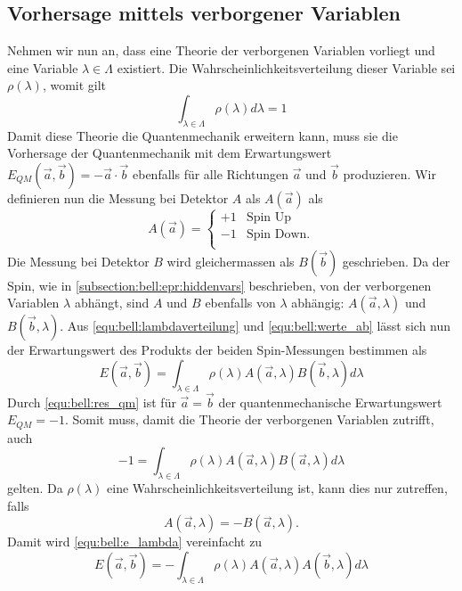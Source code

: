 \begin{refsection}
\subsection{Vorhersage mittels verborgener Variablen}
Nehmen wir nun an, dass eine Theorie der verborgenen Variablen vorliegt
und eine Variable $\lambda \in \Lambda$ existiert.
Die Wahrscheinlichkeitsverteilung dieser Variable sei $\rho(\lambda)$, womit gilt
\begin{equation}\label{equ:bell:lambdaverteilung}
    \int_{\lambda\in\Lambda} \rho(\lambda) d\lambda = 1
\end{equation}
Damit diese Theorie die Quantenmechanik erweitern kann, muss sie die Vorhersage
der Quantenmechanik mit dem Erwartungswert 
$E_{QM}(\vec{a},\vec{b}) = -\vec{a}\cdot\vec{b}$
ebenfalls f\"ur alle Richtungen $\vec{a}$ und $\vec{b}$ produzieren.
Wir definieren nun die Messung bei Detektor $A$ als $A(\vec{a})$ als
\begin{equation}\label{equ:bell:werte_ab}
    A(\vec{a}) = \begin{cases}
        +1 & \text{Spin Up} \\
        -1 & \text{Spin Down.} \\
    \end{cases}
\end{equation}
Die Messung bei Detektor $B$ wird gleichermassen als $B(\vec{b})$ geschrieben.
Da der Spin, wie in \ref{subsection:bell:epr:hiddenvars} beschrieben, von der
verborgenen Variablen $\lambda$ abh\"angt, sind $A$ und $B$ ebenfalls von
$\lambda$ abh\"angig: $A(\vec{a},\lambda)$ und $B(\vec{b},\lambda)$.
Aus \eqref{equ:bell:lambdaverteilung} und \eqref{equ:bell:werte_ab}
l\"asst sich nun der Erwartungswert des Produkts der beiden Spin-Messungen
bestimmen als
\begin{equation}\label{equ:bell:e_lambda}
    E(\vec{a},\vec{b}) = \int_{\lambda\in\Lambda} 
        \rho(\lambda) A(\vec{a},\lambda) B(\vec{b},\lambda) d\lambda
\end{equation}
Durch \eqref{equ:bell:res_qm} ist f\"ur $\vec{a} = \vec{b}$ der 
quantenmechanische Erwartungswert $E_{QM} = -1$.
Somit muss, damit die Theorie der verborgenen Variablen zutrifft, auch
\[
    -1 = \int_{\lambda\in\Lambda} 
        \rho(\lambda) A(\vec{a},\lambda) B(\vec{a},\lambda) d\lambda
\]
gelten.
Da $\rho(\lambda)$ eine Wahrscheinlichkeitsverteilung ist, kann dies nur
zutreffen, falls
\begin{equation}\label{equ:bell:antikorrelation}
    A(\vec{a},\lambda) = -B(\vec{a},\lambda).
\end{equation}
Damit wird \eqref{equ:bell:e_lambda} vereinfacht zu
\begin{equation}\label{equ:bell:e_lambda_vereinf}
    E(\vec{a},\vec{b}) = -\int_{\lambda\in\Lambda} 
        \rho(\lambda) A(\vec{a},\lambda) A(\vec{b},\lambda) d\lambda
\end{equation}


\end{refsection}
